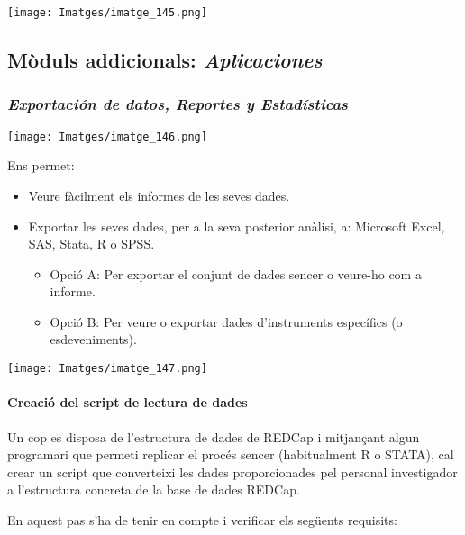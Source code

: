 \documentclass[
]{article}
\providecommand{\tightlist}{%
  \setlength{\itemsep}{0pt}\setlength{\parskip}{0pt}}
\begin{document}
\texttt{[image: Imatges/imatge\_145.png]}

\hypertarget{muxf2duls-addicionals-aplicaciones}{%
\subsection{\texorpdfstring{\textbf{Mòduls addicionals}: \emph{Aplicaciones}}{Mòduls addicionals: Aplicaciones}}\label{muxf2duls-addicionals-aplicaciones}}

\hypertarget{en9}{%
\subsubsection{\texorpdfstring{\textbf{\emph{Exportación de datos, Reportes y Estadísticas}}}{Exportación de datos, Reportes y Estadísticas}}\label{en9}}

\texttt{[image: Imatges/imatge\_146.png]}

Ens permet:

\begin{itemize}
\tightlist
\item
  Veure fàcilment els informes de les seves dades.
\item
  Exportar les seves dades, per a la seva posterior anàlisi, a: Microsoft Excel, SAS, Stata, R o SPSS.

  \begin{itemize}
  \tightlist
  \item
    Opció A: Per exportar el conjunt de dades sencer o veure-ho com a informe.
  \item
    Opció B: Per veure o exportar dades d'instruments específics (o esdeveniments).
  \end{itemize}
\end{itemize}

\texttt{[image: Imatges/imatge\_147.png]}

\hypertarget{en11}{%
\paragraph{Creació del script de lectura de dades}\label{en11}}

Un cop es disposa de l'estructura de dades de REDCap i mitjançant algun programari que permeti replicar el procés sencer (habitualment R o STATA), cal crear un script que converteixi les dades proporcionades pel personal investigador a l'estructura concreta de la base de dades REDCap.

En aquest pas s'ha de tenir en compte i verificar els següents requisits:
\end{document}
